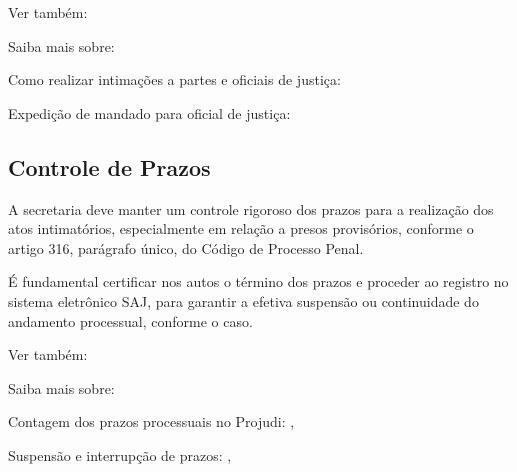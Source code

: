 \documentclass[letterpaper,10pt,brazil]{sphinxmanual}
\begin{document}
\begin{sphinxseealso}{Ver também:}

\sphinxAtStartPar
Saiba mais sobre:

\sphinxAtStartPar
Como realizar intimações a partes e oficiais de justiça: {\hyperref[\detokenize{projud_34_intimarperitooj::doc}]{}}

\sphinxAtStartPar
Expedição de mandado para oficial de justiça: {\hyperref[\detokenize{projud_32_expedicaomandado::doc}]{}}


\end{sphinxseealso}



\subsection{Controle de Prazos}
\label{\detokenize{06atosintimatorios:controle-de-prazos}}
\sphinxAtStartPar
A secretaria deve manter um controle rigoroso dos prazos para a realização dos atos intimatórios, especialmente em relação a presos provisórios, conforme o artigo 316, parágrafo único, do Código de Processo Penal.

\sphinxAtStartPar
É fundamental certificar nos autos o término dos prazos e proceder ao registro no sistema eletrônico SAJ, para garantir a efetiva suspensão ou continuidade do andamento processual, conforme o caso.


\begin{sphinxseealso}{Ver também:}

\sphinxAtStartPar
Saiba mais sobre:

\sphinxAtStartPar
Contagem dos prazos processuais no Projudi: {\hyperref[\detokenize{projud_31_contagemprazo::doc}]{}}, {\hyperref[\detokenize{projud_60_contagemprazosprocessuais::doc}]{}}

\sphinxAtStartPar
Suspensão e interrupção de prazos: {\hyperref[\detokenize{projud_38_interrupcaoprazo::doc}]{}}, {\hyperref[\detokenize{projud_39_suspensaosobrestamento::doc}]{}}


\end{sphinxseealso}
\end{document}

